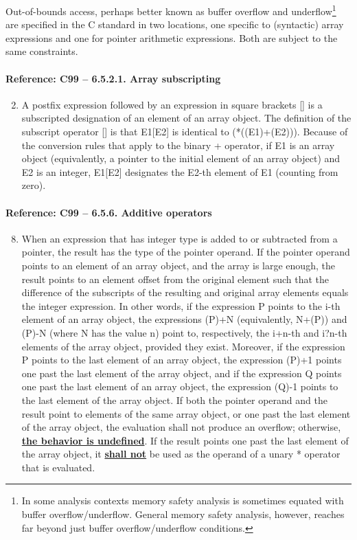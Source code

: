 \documentclass[11pt]{article}
\begin{document}
Out-of-bounds access, perhaps better known as buffer overflow and 
underflow\footnote{In some analysis contexts
memory safety analysis is sometimes equated with buffer overflow/underflow.
General memory safety analysis, however, reaches far beyond just buffer
overflow/underflow conditions.} are specified in the C standard in two
locations, one specific to (syntactic) array expressions and one for 
pointer arithmetic expressions. Both are subject to the same constraints.

\paragraph{Reference: C99 -- 6.5.2.1. Array subscripting}

\begin{enumerate}
\setcounter{enumi}{1}
\item 
A postfix expression followed by an expression in square brackets [] 
is a subscripted designation of an element of an array object. The 
definition of the subscript operator [] is that E1[E2] is identical 
to (*((E1)+(E2))). Because of the conversion rules that apply to the 
binary + operator, if E1 is an array object (equivalently, a pointer 
to the initial element of an array object) and E2 is an integer, 
E1[E2] designates the E2-th element of E1 (counting from zero).
\end{enumerate}

\paragraph{Reference: C99 -- 6.5.6. Additive operators}

\begin{enumerate}
\setcounter{enumi}{7}
\item
When an expression that has integer type is added to or subtracted from a 
pointer, the result has the type of the pointer operand. If the pointer 
operand points to an element of an array object, and the array is large 
enough, the result points to an element offset from the original element 
such that the difference of the subscripts of the resulting and original 
array elements equals the integer expression. In other words, if the 
expression P points to the i-th element of an array object, the expressions 
(P)+N (equivalently, N+(P)) and (P)-N (where N has the value n) point to, 
respectively, the i+n-th and i?n-th elements of the array object, provided 
they exist. Moreover, if the expression P points to the last element of 
an array object, the expression (P)+1 points one past the last element 
of the array object, and if the expression Q points one past the last 
element of an array object, the expression (Q)-1 points to the last 
element of the array object. If both the pointer operand and the result 
point to elements of the same array object, or one past the last element 
of the array object, the evaluation shall not produce an overflow; otherwise, 
\underline{\bf the behavior is undefined}. 
If the result points one past the last element 
of the array object, it \underline{\bf shall not} be used as the operand of a unary * 
operator that is evaluated.
\end{enumerate}
\end{document}
